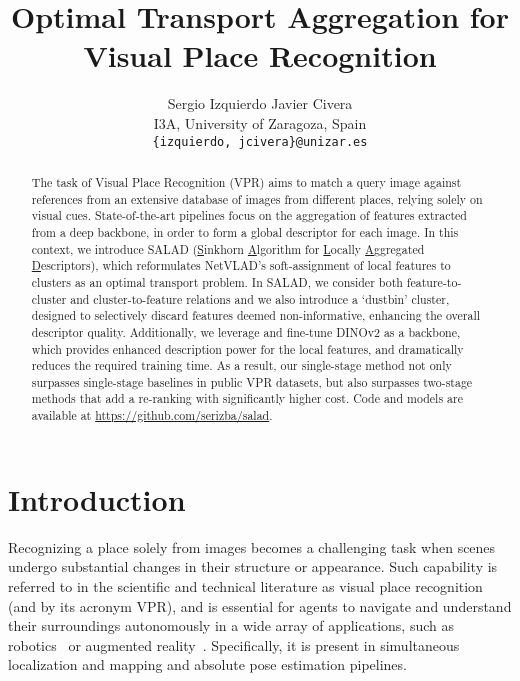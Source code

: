 \documentclass[10pt,twocolumn,letterpaper]{article}
\title{Optimal Transport Aggregation for Visual Place Recognition}
\author{Sergio Izquierdo \qquad Javier Civera\\
I3A, University of Zaragoza, Spain\\
{\tt\small \{izquierdo, jcivera\}@unizar.es}
}
\begin{document}
\maketitle
\begin{abstract}
The task of Visual Place Recognition (VPR) aims to match a query image against references from an extensive database of images from different places, relying solely on visual cues.
State-of-the-art pipelines focus on the aggregation of features extracted from a deep backbone, in order to form a global descriptor for each image.
In this context, we introduce SALAD (\underline{S}inkhorn \underline{A}lgorithm for \underline{L}ocally \underline{A}ggregated \underline{D}escriptors), which reformulates NetVLAD's soft-assignment of local features to clusters as an optimal transport problem.
In SALAD, we consider both feature-to-cluster and cluster-to-feature relations and we also introduce a `dustbin' cluster, designed to selectively discard features deemed non-informative, enhancing the overall descriptor quality.
Additionally, we leverage and fine-tune DINOv2 as a backbone, which provides enhanced description power for the local features, and dramatically reduces the required training time.
As a result, our single-stage method not only surpasses single-stage baselines in public VPR datasets, but also surpasses two-stage methods that add a re-ranking with significantly higher cost. Code and models are available at \href{https://github.com/serizba/salad}{https://github.com/serizba/salad}.
\end{abstract}


 \section{Introduction}
\label{sec:intro}

Recognizing a place solely from images becomes a challenging task when scenes undergo substantial changes in their structure or appearance. Such capability is referred to in the scientific and technical literature as visual place recognition (and by its acronym VPR), and is essential for agents to navigate and understand their surroundings autonomously in a wide array of applications, such as robotics~\cite{chen2017only,chen2017deep,chen2018learning,khaliq2019holistic, hausler2019multi} or augmented reality~\cite{garg2021your}. Specifically, it is present in simultaneous localization and mapping \cite{cadena2016past,campos2021orb} and absolute pose estimation \cite{irschara2009structure,pion2020benchmarking} pipelines. 
\end{document}
